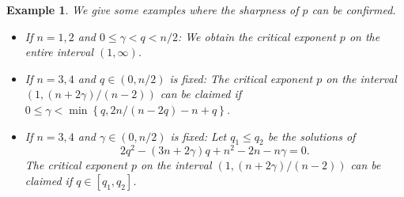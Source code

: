 \documentclass[11pt,reqno]{amsart}
\newtheorem{example}{Example}[section]
\begin{document}
\begin{example}
\selectfont
    We give some examples where the sharpness of $p$ can be confirmed. 
    \begin{itemize}[leftmargin=*]
        \item If $n=1,2$ and $0\leq \gamma<q<n/2$: We obtain the critical exponent $p$ on the entire interval $(1,\infty)$.
        \item If $n=3,4$ and $q\in (0,n/2)$ is fixed: The critical exponent $p$ on the interval $(1,(n+2\gamma)/(n-2))$ can be claimed if $0\leq \gamma<\min\left\{q,2n/(n-2q)-n+q\right\}$.
        \item If $n=3,4$ and $\gamma\in (0,n/2)$ is fixed: Let $q_1\leq q_2$ be the solutions of $$2q^2-(3n+2\gamma)q+n^2-2n-n\gamma=0.$$ The critical exponent $p$ on the interval $(1,(n+2\gamma)/(n-2))$ can be claimed if $q\in [q_1,q_2]$.
    \end{itemize}
\end{example}
\end{document}
